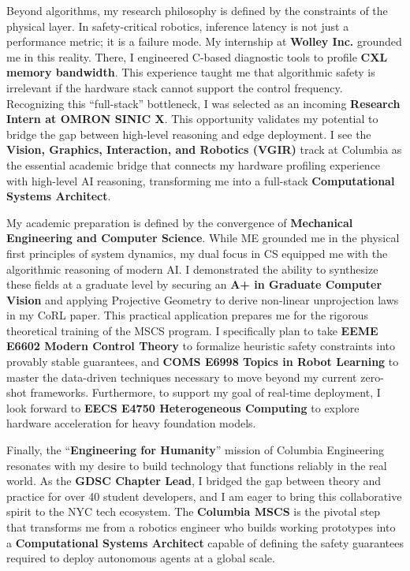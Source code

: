 \documentclass[12pt]{article}
\begin{document}
Beyond algorithms, my research philosophy is defined by the constraints of the physical layer. In safety-critical robotics, inference latency is not just a performance metric; it is a failure mode. My internship at \textbf{Wolley Inc.} grounded me in this reality. There, I engineered C-based diagnostic tools to profile \textbf{CXL memory bandwidth}. This experience taught me that algorithmic safety is irrelevant if the hardware stack cannot support the control frequency. Recognizing this ``full-stack'' bottleneck, I was selected as an incoming \textbf{Research Intern at OMRON SINIC X}. This opportunity validates my potential to bridge the gap between high-level reasoning and edge deployment. I see the \textbf{Vision, Graphics, Interaction, and Robotics (VGIR)} track at Columbia as the essential academic bridge that connects my hardware profiling experience with high-level AI reasoning, transforming me into a full-stack \textbf{Computational Systems Architect}.

My academic preparation is defined by the convergence of \textbf{Mechanical Engineering and Computer Science}. While ME grounded me in the physical first principles of system dynamics, my dual focus in CS equipped me with the algorithmic reasoning of modern AI. I demonstrated the ability to synthesize these fields at a graduate level by securing an \textbf{A+ in Graduate Computer Vision} and applying Projective Geometry to derive non-linear unprojection laws in my CoRL paper. This practical application prepares me for the rigorous theoretical training of the MSCS program. I specifically plan to take \textbf{EEME E6602 Modern Control Theory} to formalize heuristic safety constraints into provably stable guarantees, and \textbf{COMS E6998 Topics in Robot Learning} to master the data-driven techniques necessary to move beyond my current zero-shot frameworks. Furthermore, to support my goal of real-time deployment, I look forward to \textbf{EECS E4750 Heterogeneous Computing} to explore hardware acceleration for heavy foundation models.

Finally, the ``\textbf{Engineering for Humanity}'' mission of Columbia Engineering resonates with my desire to build technology that functions reliably in the real world. As the \textbf{GDSC Chapter Lead}, I bridged the gap between theory and practice for over 40 student developers, and I am eager to bring this collaborative spirit to the NYC tech ecosystem. The \textbf{Columbia MSCS} is the pivotal step that transforms me from a robotics engineer who builds working prototypes into a \textbf{Computational Systems Architect} capable of defining the safety guarantees required to deploy autonomous agents at a global scale.
\end{document}
